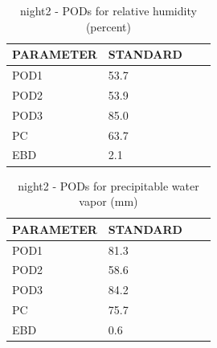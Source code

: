 \begin{table}[p!]
\begin{center}
\begin{tabular}{|l|l|l|l|}
\hline
\multicolumn{1}{|c|}{\cellcolor[HTML]{C0C0C0}\textbf{PARAMETER}} & \multicolumn{1}{c|}{\cellcolor[HTML]{C0C0C0}\textbf{STANDARD}} \\
\hline
\cellcolor[HTML]{C0C0C0}POD1  & 53.7                                \\
\cellcolor[HTML]{C0C0C0}POD2  & 53.9                                \\
\cellcolor[HTML]{C0C0C0}POD3  & 85.0                                \\
\cellcolor[HTML]{C0C0C0}PC    & 63.7                                  \\
\cellcolor[HTML]{C0C0C0}EBD   & 2.1                                 \\
\hline
\end{tabular}
\caption{night2 - PODs for relative humidity (percent)}
\label{tab:podrh:night2}
\end{center}
\end{table}
\begin{table}[p!]
\begin{center}
\begin{tabular}{|l|l|l|l|}
\hline
\multicolumn{1}{|c|}{\cellcolor[HTML]{C0C0C0}\textbf{PARAMETER}} & \multicolumn{1}{c|}{\cellcolor[HTML]{C0C0C0}\textbf{STANDARD}} \\
\hline
\cellcolor[HTML]{C0C0C0}POD1  & 81.3                                \\
\cellcolor[HTML]{C0C0C0}POD2  & 58.6                                \\
\cellcolor[HTML]{C0C0C0}POD3  & 84.2                                \\
\cellcolor[HTML]{C0C0C0}PC    & 75.7                                  \\
\cellcolor[HTML]{C0C0C0}EBD   & 0.6                                 \\
\hline
\end{tabular}
\caption{night2 - PODs for precipitable water vapor (mm)}
\label{tab:podpwv:night2}
\end{center}
\end{table}
